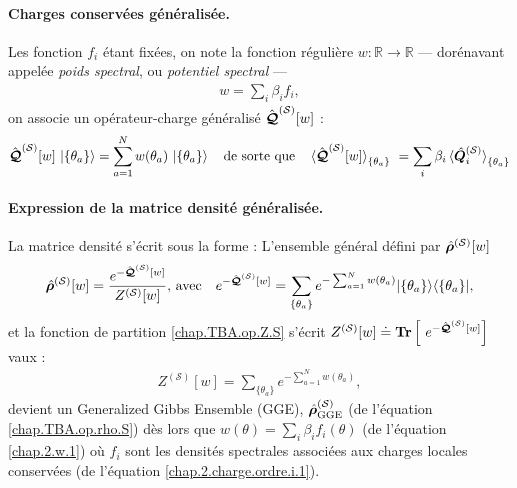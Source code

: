 \paragraph{Charges conservées généralisée.\label{sec:charges-gen}}
Les fonction $f_i$ étant fixées, on note la fonction régulière
\(
  w:\mathbb R\!\to\!\mathbb R
\)
–– dorénavant appelée \emph{poids spectral}, ou \emph{potentiel spectral} ––
\begin{eqnarray}
	w = \sum_i \beta_i f_i \label{chap.2.w.1},	
\end{eqnarray}
on associe un opérateur-charge généralisé $\hat{\bm{\mathcal{Q}}}^{(\mathcal{S})}[w]$ :
\begin{eqnarray}\label{chap.2.charge.gen.1}
	\operator{\mathcal{Q}}^{(\mathcal{S})}[w]\,\ket{\{\theta_a\} } =  \sum_{a=1}^{N}w(\theta_a)\,\ket{\{\theta_a\} } \quad \mbox{de sorte que} \quad \braket{\operator{\mathcal{Q}}^{(\mathcal{S})}[w]}_{\{\theta_a\}} = \sum_{i} \beta_i  \braket{\operator{Q}^{(\mathcal{S})}_i}_{\{\theta_a\}}
\end{eqnarray}

\paragraph{Expression de la matrice densité généralisée.}
La matrice densité  s’écrit sous la forme :
L’ensemble général défini par $\hat{\bm{\rho}}^{(\mathcal{S})}[w]$ 
\begin{eqnarray}\label{chap.2.densite.1}
	\hat{\bm{\rho}}^{(\mathcal{S})}[w]  =  \frac{e^{-\hat{\bm{\mathcal{Q}}}^{(\mathcal{S})}[w]}}{Z^{(\mathcal{S})}[w]}, \, \mbox{avec} \quad e^{-\hat{\bm{\mathcal{Q}}}^{(\mathcal{S})}[w]}  = 	\sum_{\{\theta_a \}} e^{- \sum_{a = 1}^N w(\theta_a) } \vert \{ \theta_a\} \rangle \langle  \{ \theta_a\}  \vert, 
\end{eqnarray}	
et la fonction de partition \eqref{chap.TBA.op.Z.S} s'écrit $Z^{(\mathcal{S})}[w]\doteq \bm{\mathrm{Tr}}\left [ e^{-\operator{\mathcal{Q}}^{(\mathcal{S})}[w]}\right ] $ vaux :
\begin{eqnarray}
	Z^{(\mathcal{S})}[w]   =  \sum_{\{\theta_a \}} e^{-\sum_{a = 1}^N w(\theta_a)},\label{chap.TBA.op.Z.S.1}	
\end{eqnarray}
devient un Generalized Gibbs Ensemble (GGE), $\hat{\bm{\rho}}^{(\mathcal{S})}_{\mathrm{GGE}}$ (de l'équation \eqref{chap.TBA.op.rho.S})	 dès lors que $w(\theta) = \sum_i \beta_i f_i(\theta)$ (de l'équation \eqref{chap.2.w.1}) où $f_i$ sont les densités spectrales associées aux charges locales conservées (de l'équation \eqref{chap.2.charge.ordre.i.1}).


